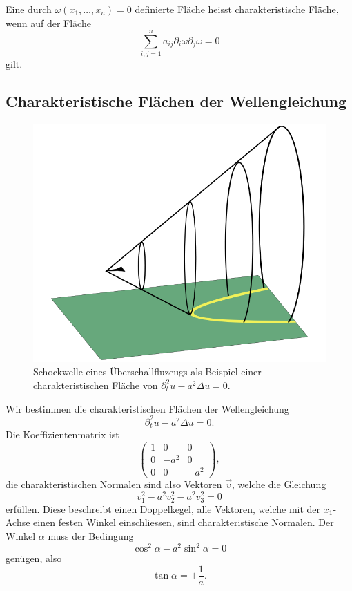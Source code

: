\begin{definition}
Eine durch $\omega(x_1,\dots,x_n)=0$ definierte Fläche heisst
charakteristische Fläche, wenn auf der Fläche
\[
\sum_{i,j=1}^na_{ij}\partial_i\omega\partial_j\omega=0
\]
gilt.
\end{definition}

\subsection{Charakteristische Flächen der Wellengleichung}
\begin{figure}
\begin{center}
\includegraphics[width=0.8\hsize]{graphics/shock}
\end{center}
\caption{Schockwelle eines Überschallfluzeugs als Beispiel einer
charakteristischen Fläche von $\partial_t^2u-a^2\Delta u=0$.\label{ueberschallkegel}}
\end{figure}
Wir bestimmen die charakteristischen Flächen der
Wellengleichung
\[
\partial_t^2u-a^2\Delta u=0.
\]
Die Koeffizientenmatrix ist
\[
\begin{pmatrix}
1&0&0\\
0&-a^2&0\\
0&0&-a^2
\end{pmatrix},
\]
die charakteristischen Normalen sind also Vektoren $\vec v$, welche die
Gleichung
\[
v_1^2-a^2v_2^2-a^2v_3^2=0
\]
erfüllen. Diese beschreibt einen Doppelkegel, alle Vektoren, welche mit
der $x_1$-Achse einen festen Winkel einschliessen, sind charakteristische
Normalen. Der Winkel $\alpha$ muss der Bedingung
\[
\cos^2\alpha-a^2\sin^2\alpha=0
\]
genügen, also
\[
\tan\alpha=\pm\frac1a.
\]

